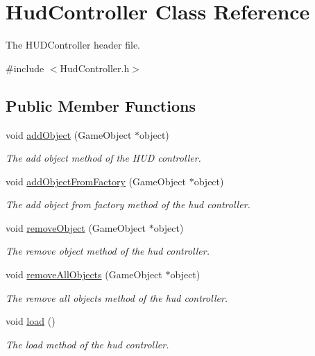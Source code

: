\hypertarget{class_hud_controller}{\section{Hud\-Controller Class Reference}
\label{class_hud_controller}
}


The H\-U\-D\-Controller header file.  




{\ttfamily \#include $<$Hud\-Controller.\-h$>$}

\subsection*{Public Member Functions}
\begin{DoxyCompactItemize}
\item 
void \hyperlink{class_hud_controller_a27862a3db822f65de6dbcf22835ec58a}{add\-Object} (Game\-Object $\ast$object)
\begin{DoxyCompactList}\small\item\em The add object method of the H\-U\-D controller. \end{DoxyCompactList}\item 
void \hyperlink{class_hud_controller_abaab3a30a47733b2588236100267e206}{add\-Object\-From\-Factory} (Game\-Object $\ast$object)
\begin{DoxyCompactList}\small\item\em The add object from factory method of the hud controller. \end{DoxyCompactList}\item 
void \hyperlink{class_hud_controller_ab07bc4161257a8fbc16df56ed9dbf1ea}{remove\-Object} (Game\-Object $\ast$object)
\begin{DoxyCompactList}\small\item\em The remove object method of the hud controller. \end{DoxyCompactList}\item 
void \hyperlink{class_hud_controller_aac63180083695594ae2d17278c13d604}{remove\-All\-Objects} (Game\-Object $\ast$object)
\begin{DoxyCompactList}\small\item\em The remove all objects method of the hud controller. \end{DoxyCompactList}\item 
void \hyperlink{class_hud_controller_abeeed176eb5114ce613c499135c528d4}{load} ()
\begin{DoxyCompactList}\small\item\em The load method of the hud controller. \end{DoxyCompactList}\item 

\end{DoxyCompactItemize}
